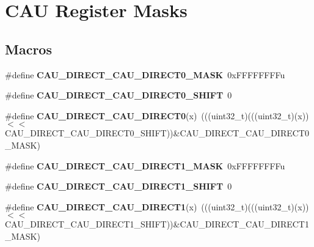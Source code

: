 \hypertarget{group__CAU__Register__Masks}{}\section{C\+AU Register Masks}
\label{group__CAU__Register__Masks}
\subsection*{Macros}
\begin{DoxyCompactItemize}
\item 
\#define {\bfseries C\+A\+U\+\_\+\+D\+I\+R\+E\+C\+T\+\_\+\+C\+A\+U\+\_\+\+D\+I\+R\+E\+C\+T0\+\_\+\+M\+A\+SK}~0x\+F\+F\+F\+F\+F\+F\+F\+Fu\hypertarget{group__CAU__Register__Masks_ga44f4bea009f3e9943e310dbbed98f7a3}{}\label{group__CAU__Register__Masks_ga44f4bea009f3e9943e310dbbed98f7a3}

\item 
\#define {\bfseries C\+A\+U\+\_\+\+D\+I\+R\+E\+C\+T\+\_\+\+C\+A\+U\+\_\+\+D\+I\+R\+E\+C\+T0\+\_\+\+S\+H\+I\+FT}~0\hypertarget{group__CAU__Register__Masks_ga53178110db052d34395df9ad7e9afd0e}{}\label{group__CAU__Register__Masks_ga53178110db052d34395df9ad7e9afd0e}

\item 
\#define {\bfseries C\+A\+U\+\_\+\+D\+I\+R\+E\+C\+T\+\_\+\+C\+A\+U\+\_\+\+D\+I\+R\+E\+C\+T0}(x)~(((uint32\+\_\+t)(((uint32\+\_\+t)(x))$<$$<$C\+A\+U\+\_\+\+D\+I\+R\+E\+C\+T\+\_\+\+C\+A\+U\+\_\+\+D\+I\+R\+E\+C\+T0\+\_\+\+S\+H\+I\+FT))\&C\+A\+U\+\_\+\+D\+I\+R\+E\+C\+T\+\_\+\+C\+A\+U\+\_\+\+D\+I\+R\+E\+C\+T0\+\_\+\+M\+A\+SK)\hypertarget{group__CAU__Register__Masks_ga2cb8f0d18407e272c7d87b9e747f278b}{}\label{group__CAU__Register__Masks_ga2cb8f0d18407e272c7d87b9e747f278b}

\item 
\#define {\bfseries C\+A\+U\+\_\+\+D\+I\+R\+E\+C\+T\+\_\+\+C\+A\+U\+\_\+\+D\+I\+R\+E\+C\+T1\+\_\+\+M\+A\+SK}~0x\+F\+F\+F\+F\+F\+F\+F\+Fu\hypertarget{group__CAU__Register__Masks_ga201696a74ac7fd3db77cd19d3d2110cf}{}\label{group__CAU__Register__Masks_ga201696a74ac7fd3db77cd19d3d2110cf}

\item 
\#define {\bfseries C\+A\+U\+\_\+\+D\+I\+R\+E\+C\+T\+\_\+\+C\+A\+U\+\_\+\+D\+I\+R\+E\+C\+T1\+\_\+\+S\+H\+I\+FT}~0\hypertarget{group__CAU__Register__Masks_ga99cc153a4a7217feeea9ccc898a38d98}{}\label{group__CAU__Register__Masks_ga99cc153a4a7217feeea9ccc898a38d98}

\item 
\#define {\bfseries C\+A\+U\+\_\+\+D\+I\+R\+E\+C\+T\+\_\+\+C\+A\+U\+\_\+\+D\+I\+R\+E\+C\+T1}(x)~(((uint32\+\_\+t)(((uint32\+\_\+t)(x))$<$$<$C\+A\+U\+\_\+\+D\+I\+R\+E\+C\+T\+\_\+\+C\+A\+U\+\_\+\+D\+I\+R\+E\+C\+T1\+\_\+\+S\+H\+I\+FT))\&C\+A\+U\+\_\+\+D\+I\+R\+E\+C\+T\+\_\+\+C\+A\+U\+\_\+\+D\+I\+R\+E\+C\+T1\+\_\+\+M\+A\+SK)\hypertarget{group__CAU__Register__Masks_ga187f19ca2f30c2ec338747f4a83f97a4}{}\label{group__CAU__Register__Masks_ga187f19ca2f30c2ec338747f4a83f97a4}


\end{DoxyCompactItemize}
